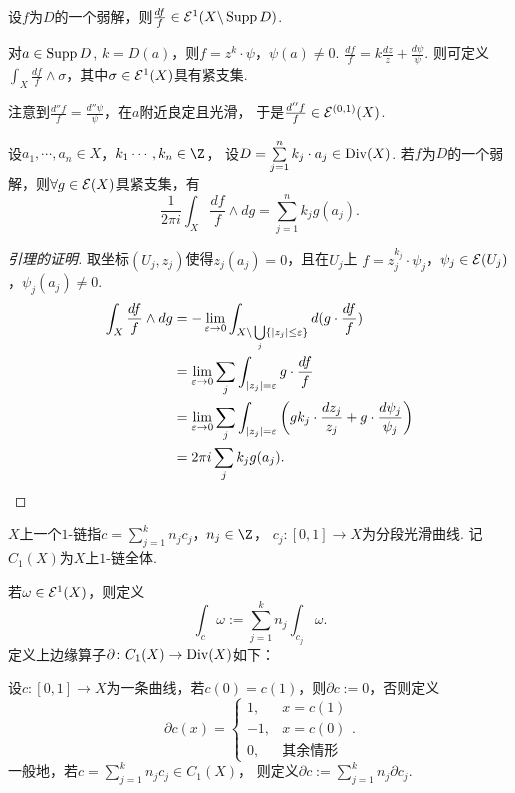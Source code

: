 \begin{proposition}
	设$f$为$D$的一个弱解，则$\frac{df}{f}\in \mathcal{E}^1(X\backslash \operatorname{Supp} D)$.
\end{proposition}

\begin{definition}
	对$a\in \operatorname{Supp} D$, $k=D(a)$，则$f=z^k \cdot \psi$，$\psi(a)\neq 0$.
	$\frac{df}{f}=k\frac{dz}{z}+\frac{d\psi}{\psi}$. 
    则可定义$\int_X\frac{df}{f}\wedge \sigma$，其中$\sigma\in \mathcal{E}^1(X)$具有紧支集.

	注意到$\frac{d''f}{f}=\frac{d''\psi}{\psi}$，在$a$附近良定且光滑，
    于是$\frac{d''f}{f}\in \mathcal{E}^{(0,1)}(X)$.
	\end{definition}

\begin{lemma}\label{aaa}
	设$a_1,\cdots,a_n\in X$，$k_1\cdots,k_n\in \Z$，
    设$D=\sum\limits_{j=1}^n k_j\cdot a_j \in \operatorname{Div}(X)$. 
    若$f$为$D$的一个弱解，则$\forall g\in \mathcal{E}(X)$具紧支集，有
	$$\frac{1}{2\pi i}\int_X \frac{df}{f}\wedge dg
    =\sum_{j=1}^n k_j g(a_j).$$
\end{lemma}

\begin{proof}[引理的证明]
	取坐标$(U_j,z_j)$使得$z_j(a_j)=0$，且在$U_j$上
    $f=z_j^{k_j}\cdot \psi_j$，$\psi_j\in \mathcal{E}(U_j)$，$\psi_j(a_j)\neq 0$.
	\begin{align*}
		\int_X \frac{df}{f}\wedge dg
        &=-\lim_{\varepsilon \to 0} \int_{X\backslash \bigcup\limits_j \{\vert z_j\vert \leq \varepsilon\} } d(g\cdot \frac{df}{f})\\
		&=\lim_{\varepsilon \to 0} \sum_j \int_{\vert z_j \vert =\varepsilon} g\cdot \frac{df}{f}\\
		&=\lim_{\varepsilon \to 0} \sum_j \int_{\vert z_j \vert =\varepsilon} \left(gk_j\cdot \frac{dz_j}{z_j}+g\cdot \frac{d\psi_j}{\psi_j}\right)\\
		&=2\pi i \sum_j k_jg(a_j).
	\end{align*}
\end{proof}
		
\begin{definition}
	$X$上一个$1$-链指$c=\sum\limits_{j=1}^k n_jc_j$，$n_j\in \Z$，
    $c_j\colon [0,1]\rightarrow X$为分段光滑曲线. 记$C_1(X)$为$X$上$1$-链全体.

	若$\omega\in \mathcal{E}^1(X)$，则定义
    \[\int_c\omega:=\sum_{j=1}^k n_j \int_{c_j}\omega.\]
    定义上边缘算子$\partial\colon C_1(X) \rightarrow \operatorname{Div}(X)$如下：

	设$c\colon [0,1]\rightarrow X$为一条曲线，若$c(0)=c(1)$，则$\partial c:=0$，否则定义
	$$\partial c(x)=\begin{cases} 1, &x=c(1)\\ -1, &x=c(0)\\ 0, &\text{其余情形}\end{cases}.$$
	一般地，若$c=\sum\limits_{j=1}^k n_jc_j\in C_1(X)$，
    则定义$\partial c:= \sum\limits_{j=1}^k n_j \partial c_j$.
\end{definition}

